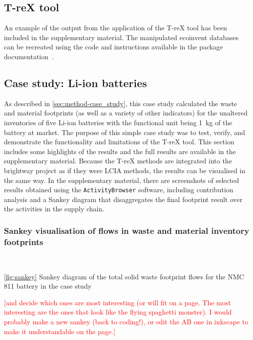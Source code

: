 \subsection{T-reX tool}\label{sec:results-T-reX}

An example of the output from the application of the T-reX tool has been included in the supplementary material. The manipulated ecoinvent databases 
can be recreated using the code and instructions available in the package documentation~\citep{mcdowall2023T-reXdocs}.

\subsection{Case study: Li-ion batteries}\label{sec:results-case_study}

As described in \autoref{sec:method-case_study}, this case study calculated the waste and material footprints (as well as a variety of other indicators) for the unaltered inventories of five Li-ion batteries with the functional unit being 1~kg of the battery at market. The purpose of this simple case study was to test, verify, and demonstrate the functionality and limitations of the T-reX tool. This section includes some highlights of the results and the full results are available in the supplementary material. Because the T-reX methods are integrated into the brightway project as if they were LCIA methods, the results can be visualised in the same way. In the supplementary material, there are screenshots of selected results obtained using the \texttt{ActivityBrowser} software, including contribution analysis and a Sankey diagram that disaggregates the final footprint result over the activities in the supply chain.

\subsubsection{Sankey visualisation of flows in waste and material inventory footprints}\label{sec:results-case_study-sankey}
\

\autoref{fig:sankey} Sankey diagram of the total solid waste footprint flows for the NMC 811 battery in the case study


\textcolor{red}{[and decide which ones are most interesting (or will fit on a page. The most interesting are the ones that look like the flying spaghetti monster). I would probably make a new sankey (back to coding!), or edit the AB one in inkscape to make it understandable on the page.]}

